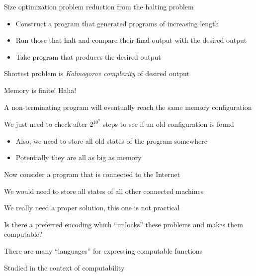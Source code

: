 \documentclass{beamer}
\begin{document}
\begin{slide}{
\item Size optimization problem reduction from the halting problem
\begin{itemize}
\item Construct a program that generated programs of increasing length
\item Run those that halt and compare their final output with the desired output
\item Take program that produces the desired output
\end{itemize}
\item Shortest problem is \textit{Kolmogorov complexity} of desired output
}\end{slide}

\begin{slide}{
\item Memory is finite! Haha!
\pause
\item A non-terminating program will eventually reach the same memory configuration
\item We just need to check after $2^{10^9}$ steps to see if an old configuration is found
\begin{itemize}
\item Also, we need to store all old states of the program somewhere
\item Potentially they are all as big as memory
\end{itemize}
}\end{slide}

\begin{slide}{
\item Now consider a program that is connected to the Internet
\item We would need to store all states of all other connected machines
\pause
\item We really need a proper solution, this one is not practical
}\end{slide}

\begin{slide}{
\item Is there a preferred encoding which ``unlocks'' these problems and makes them computable?
\item There are many ``languages'' for expressing computable functions
\item Studied in the context of computability
}\end{slide}
\end{document}
